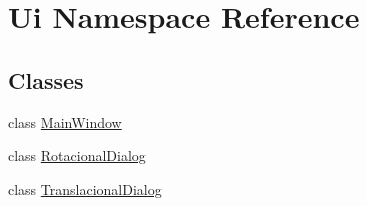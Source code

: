 \hypertarget{namespace_ui}{\section{Ui Namespace Reference}
\label{namespace_ui}
}
\subsection*{Classes}
\begin{DoxyCompactItemize}
\item 
class \hyperlink{class_ui_1_1_main_window}{Main\-Window}
\item 
class \hyperlink{class_ui_1_1_rotacional_dialog}{Rotacional\-Dialog}
\item 
class \hyperlink{class_ui_1_1_translacional_dialog}{Translacional\-Dialog}
\end{DoxyCompactItemize}

